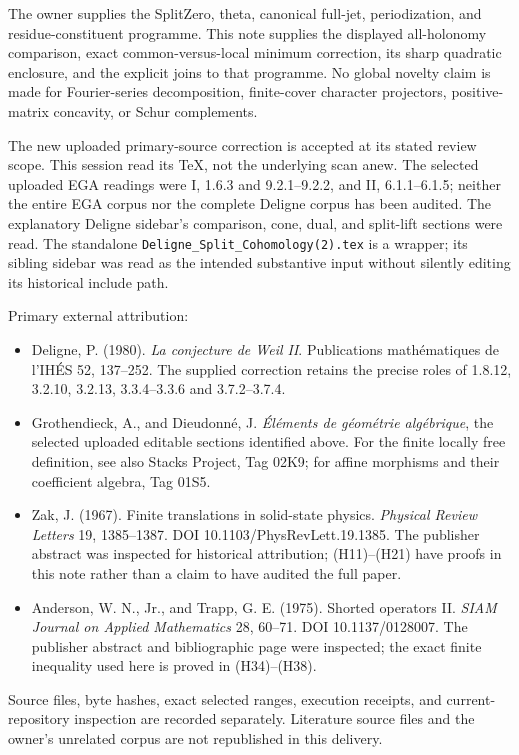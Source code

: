 The owner supplies the SplitZero, theta, canonical full-jet,
periodization, and residue-constituent programme. This note supplies the
displayed all-holonomy comparison, exact common-versus-local minimum
correction, its sharp quadratic enclosure, and the explicit joins to
that programme. No global novelty claim is made for Fourier-series
decomposition, finite-cover character projectors, positive-matrix
concavity, or Schur complements.

The new uploaded primary-source correction is accepted at its stated
review scope. This session read its TeX, not the underlying scan anew.
The selected uploaded EGA readings were I, 1.6.3 and 9.2.1--9.2.2, and
II, 6.1.1--6.1.5; neither the entire EGA corpus nor the complete Deligne
corpus has been audited. The explanatory Deligne sidebar's comparison,
cone, dual, and split-lift sections were read. The standalone
\texttt{Deligne\_Split\_Cohomology(2).tex} is a wrapper; its sibling
sidebar was read as the intended substantive input without silently
editing its historical include path.

Primary external attribution:

\begin{itemize}
\tightlist
\item
  Deligne, P. (1980). \emph{La conjecture de Weil II}. Publications
  mathématiques de l'IHÉS 52, 137--252. The supplied correction retains
  the precise roles of 1.8.12, 3.2.10, 3.2.13, 3.3.4--3.3.6 and
  3.7.2--3.7.4.
\item
  Grothendieck, A., and Dieudonné, J. \emph{Éléments de géométrie
  algébrique}, the selected uploaded editable sections identified above.
  For the finite locally free definition, see also Stacks Project, Tag
  02K9; for affine morphisms and their coefficient algebra, Tag 01S5.
\item
  Zak, J. (1967). Finite translations in solid-state physics.
  \emph{Physical Review Letters} 19, 1385--1387. DOI
  10.1103/PhysRevLett.19.1385. The publisher abstract was inspected for
  historical attribution; (H11)--(H21) have proofs in this note rather
  than a claim to have audited the full paper.
\item
  Anderson, W. N., Jr., and Trapp, G. E. (1975). Shorted operators II.
  \emph{SIAM Journal on Applied Mathematics} 28, 60--71. DOI
  10.1137/0128007. The publisher abstract and bibliographic page were
  inspected; the exact finite inequality used here is proved in
  (H34)--(H38).
\end{itemize}

Source files, byte hashes, exact selected ranges, execution receipts,
and current-repository inspection are recorded separately. Literature
source files and the owner's unrelated corpus are not republished in
this delivery.

